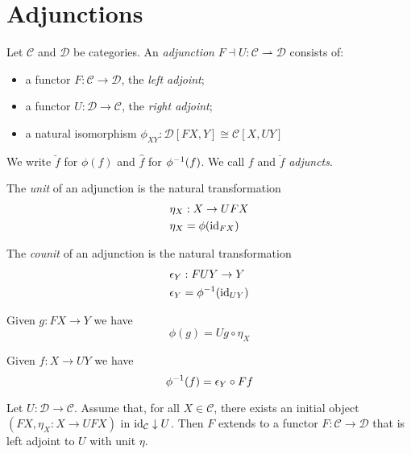 \chapter{Adjunctions}

\begin{df}[Adjunction]
Let $\mathcal{C}$ and $\mathcal{D}$ be categories. An \emph{adjunction} $F \dashv U : \mathcal{C} \rightharpoonup \mathcal{D}$ consists of:
\begin{itemize}
\item a functor $F : \mathcal{C} \rightarrow \mathcal{D}$, the \emph{left adjoint};
\item a functor $U : \mathcal{D} \rightarrow \mathcal{C}$, the \emph{right adjoint};
\item a natural isomorphism $\phi_{XY} : \mathcal{D}[FX,Y] \cong \mathcal{C}[X,UY]$
\end{itemize}
We write $\breve{f}$ for $\phi(f)$ and $\hat{f}$ for ${\phi}^{-1}(f)$. We call $f$ and $\breve{f}$ \emph{adjuncts}.
\end{df}

\begin{df}[Unit]
The \emph{unit} of an adjunction is the natural transformation
\begin{align*}
\eta_X & : X \rightarrow UFX \\
\eta_X & = \phi(\mathrm{id}_{FX})
\end{align*}
\end{df}

\begin{df}[Counit]
The \emph{counit} of an adjunction is the natural transformation
\begin{align*}
\epsilon_Y & : FUY \rightarrow Y \\
\epsilon_Y & = {\phi}^{-1}(\mathrm{id}_{UY})
\end{align*}
\end{df}

\begin{prop}
Given $g : FX \rightarrow Y$ we have
\[ \phi(g) = Ug \circ \eta_X \]
\end{prop}

\begin{prop}
Given $f : X \rightarrow UY$ we have
\[ {\phi}^{-1}(f) = \epsilon_Y \circ Ff \]
\end{prop}

\begin{prop}
Let $U : \mathcal{D} \rightarrow \mathcal{C}$. Assume that, for all $X \in \mathcal{C}$, there exists an initial object $(FX,\eta_X : X \rightarrow UFX)$ in $\mathrm{id}_{\mathcal{C}} \downarrow U$. Then $F$ extends to a functor $F : \mathcal{C} \rightarrow \mathcal{D}$ that is left adjoint to $U$ with unit $\eta$.
\end{prop}

